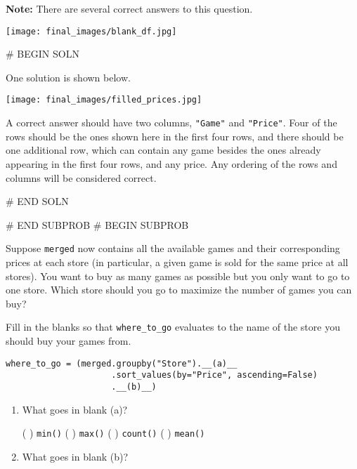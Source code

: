 \documentclass[twoside,12pt]{article}
\begin{document}
{         \textbf{Note:} There are several correct answers to this question.

\begin{center}
\texttt{[image: final\_images/blank\_df.jpg]}
\end{center}

# BEGIN SOLN


One solution is shown below.
\begin{center}
\texttt{[image: final\_images/filled\_prices.jpg]}
\end{center} 
A correct answer should have two columns, \texttt{"Game"} and \texttt{"Price"}. Four of the rows should be the ones shown here in the first four rows, and there should be one additional row, which can contain any game besides the ones already appearing in the first four rows, and any price. Any ordering of the rows and columns will be considered correct.


# END SOLN

    

# END SUBPROB
    # BEGIN SUBPROB


        Suppose \texttt{merged} now contains all the available games and their corresponding prices at each store (in particular, a given game is sold for the same price at all stores). You want to buy as many games as possible but you only want to go to one store. Which store should you go to maximize the number of games you can buy?

        Fill in the blanks so that \texttt{where\_to\_go} evaluates to the name of the store you should buy your games from.

\begin{verbatim}
where_to_go = (merged.groupby("Store").__(a)__
                     .sort_values(by="Price", ascending=False)
                     .__(b)__)
\end{verbatim}

    \begin{enumerate}[label=(\roman*)]
    \item What goes in blank (a)?

    \begin{center}
    ( ) \texttt{min()}    
    ( ) \texttt{max()}    
    ( ) \texttt{count()}    
    ( ) \texttt{mean()}  
    \end{center}

    \item What goes in blank (b)?  
    \end{enumerate}
    

}
\end{document}
